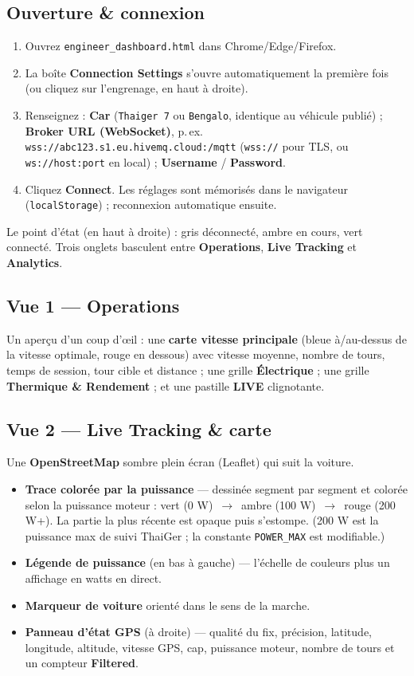 \documentclass[11pt,a4paper,oneside]{report}
\newcommand{\arrow}{\,$\rightarrow$\,}
\newcommand{\code}[1]{\texttt{#1}}
\begin{document}
\subsection{Ouverture \& connexion}
\begin{enumerate}
  \item Ouvrez \code{engineer\_dashboard.html} dans Chrome/Edge/Firefox.
  \item La boîte \textbf{Connection Settings} s'ouvre automatiquement la première
    fois (ou cliquez sur l'engrenage, en haut à droite).
  \item Renseignez : \textbf{Car} (\code{Thaiger 7} ou \code{Bengalo}, identique au
    véhicule publié) ; \textbf{Broker URL (WebSocket)}, p.\,ex.
    \code{wss://abc123.s1.eu.hivemq.cloud:/mqtt} (\code{wss://} pour TLS, ou
    \code{ws://host:port} en local) ; \textbf{Username} / \textbf{Password}.
  \item Cliquez \textbf{Connect}. Les réglages sont mémorisés dans le navigateur
    (\code{localStorage}) ; reconnexion automatique ensuite.
\end{enumerate}
Le point d'état (en haut à droite) : gris déconnecté, ambre en cours, vert
connecté. Trois onglets basculent entre \textbf{Operations}, \textbf{Live Tracking}
et \textbf{Analytics}.

\subsection{Vue 1 --- Operations}
Un aperçu d'un coup d'œil : une \textbf{carte vitesse principale} (bleue à/au-dessus
de la vitesse optimale, rouge en dessous) avec vitesse moyenne, nombre de tours,
temps de session, tour cible et distance ; une grille \textbf{Électrique} ; une
grille \textbf{Thermique \& Rendement} ; et une pastille \textbf{LIVE} clignotante.

\subsection{Vue 2 --- Live Tracking \& carte}
Une \textbf{OpenStreetMap} sombre plein écran (Leaflet) qui suit la voiture.
\begin{itemize}
  \item \textbf{Trace colorée par la puissance} --- dessinée segment par segment et
    colorée selon la puissance moteur : \textcolor{tgreen}{vert (0 W)} \arrow{}
    \textcolor{tamber}{ambre (100 W)} \arrow{} \textcolor{tred}{rouge (200 W+)}. La
    partie la plus récente est opaque puis s'estompe. (200 W est la puissance max de
    suivi ThaiGer ; la constante \code{POWER\_MAX} est modifiable.)
  \item \textbf{Légende de puissance} (en bas à gauche) --- l'échelle de couleurs
    plus un affichage en watts en direct.
  \item \textbf{Marqueur de voiture} orienté dans le sens de la marche.
  \item \textbf{Panneau d'état GPS} (à droite) --- qualité du fix, précision,
    latitude, longitude, altitude, vitesse GPS, cap, puissance moteur, nombre de
    tours et un compteur \textbf{Filtered}.
\end{itemize}
\end{document}

